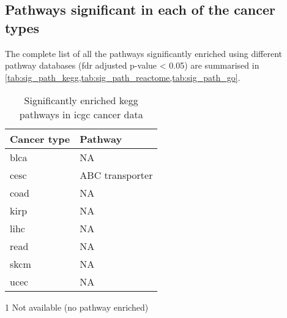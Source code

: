 \begin{appendices}
\section{Pathways significant in each of the cancer types}
\label{sec:pathways_significant_in_each_of_the_cancer_types}

The complete list of all the pathways significantly enriched using different pathway databases (\gls{fdr} adjusted p-value \textless{} 0.05) are summarised in \cref{tab:sig_path_kegg,tab:sig_path_reactome,tab:sig_path_go}.

\begin{table}[htpb]
	\centering
	\caption{Significantly enriched \gls{kegg} pathways in \gls{icgc} cancer data}
	\label{tab:sig_path_kegg}
	\begin{threeparttable}
		\begin{tabular}{ll}
			Cancer type                      & Pathway         \\
			\hline
			\hline
				\rule{0pt}{2.25ex}\gls{blca} & NA\tnote{1}             \\
				\gls{cesc}                   & ABC transporter \\
				\gls{coad}                   & NA              \\
				\gls{kirp}                   & NA              \\
				\gls{lihc}                   & NA              \\
				\gls{read}                   & NA              \\
				\gls{skcm}                   & NA              \\
				\gls{ucec}                   & NA              \\
			\hline
			\hline
		\end{tabular}
		\begin{tablenotes}
			\item [1] Not available (no pathway enriched)
		\end{tablenotes}
	\end{threeparttable}
\end{table}


\end{appendices}
